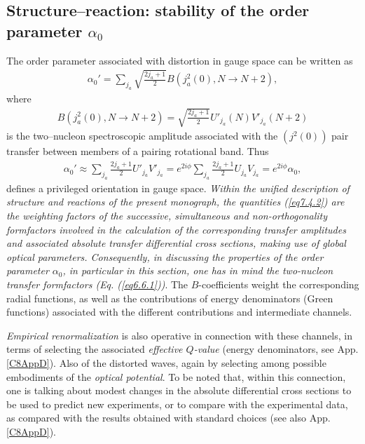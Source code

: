 \subsection{Structure--reaction: stability of the order parameter $\alpha_0$}\label{C6S2.3}
The order parameter associated with distortion in gauge space can be written as 
\begin{align}\label{eq7.2.1}
\alpha_0'=\sum_{j_a}\sqrt{\frac{2j_a+1}{2}}B(j^2_a(0),N\to N+2),
\end{align}
where
\begin{align}\label{eq6.4.15x}
B(j^2_a(0),N\to N+2)=\sqrt{\frac{2j_a+1}{2}}U'_{j_a}(N)V'_{j_a}(N+2)
\end{align}
is the two--nucleon spectroscopic amplitude associated with the $(j^2(0))$ pair transfer between members of a pairing rotational band. Thus 
\begin{align}\label{eq6.4.15}
\alpha_0'\approx\sum_{j_a}\frac{2j_a+1}{2}U'_{j_a}V'_{j_a}=e^{2i\phi}\sum_{j_a}\frac{2j_a+1}{2}U_{j_a}V_{j_a}=e^{2i\phi}\alpha_0,
\end{align}
defines a privileged orientation in gauge space. \textit{Within the unified description of structure and reactions of the present monograph, the quantities (\ref{eq7.4.2}) are the weighting factors of the successive, simultaneous and non-orthogonality formfactors involved in the calculation of the corresponding transfer amplitudes and associated absolute transfer differential cross sections, making use of global optical parameters. Consequently, in discussing the properties of the order parameter $\alpha_0$, in particular in this section, one has in mind the two-nucleon transfer formfactors (Eq. (\ref{eq6.6.1}))}.  The $B$-coefficients weight the corresponding radial functions, as well as the contributions of energy denominators (Green functions) associated with the different contributions and intermediate channels.


 \textit{Empirical renormalization} is also operative in connection with these channels, in terms of selecting the associated \emph{effective $Q$-value} (energy denominators, see App. \ref{C8AppD}). Also of the distorted waves, again by selecting among possible embodiments of the \textit{optical potential}. To be noted that, within this connection, one is talking about  modest changes in the absolute differential cross sections to be used to predict new experiments, or to compare with the experimental data, as compared with the results obtained with standard choices (see also App. \ref{C8AppD}).

